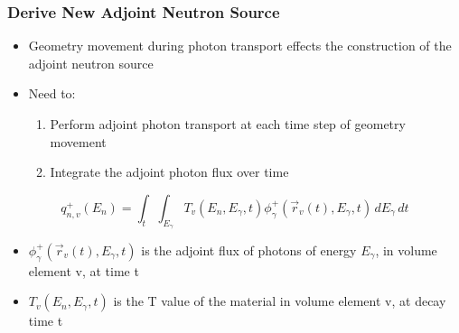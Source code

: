 \documentclass{beamer}
\begin{document}
\begin{frame}
\frametitle{Derive New Adjoint Neutron Source}
	\begin{itemize}
		\item{Geometry movement during photon transport effects the
			construction of the adjoint neutron source}
		\item{Need to:}
			\begin{enumerate}
				\item{Perform adjoint photon transport at each
					time step of geometry movement}
				\item{Integrate the adjoint photon flux over time}
			\end{enumerate}
	\end{itemize}

  \begin{equation}\label{eq:adj_src_1_avg}
	 q_{n,v}^{+}(E_{n}) =
	 \int_{t}  \int_{E_{\gamma}}
	 T_{v}(E_n, E_{\gamma}, t) 
	 \phi_{\gamma}^{+}(\overrightarrow{r}_{v}(t), E_{\gamma},t)
	 \, dE_{\gamma} \, dt
  \end{equation}

\begin{itemize}
\item{$\phi_{\gamma}^{+}(\overrightarrow{r}_{v}(t), E_{\gamma},t) $ is the 
adjoint flux of photons of energy $E_{\gamma}$, in volume element v, at time t}
\item{$T_{v}(E_n, E_{\gamma}, t) $ is the T value of the material in volume
		element v, at decay time t}
\end{itemize}
\end{frame}
\end{document}
